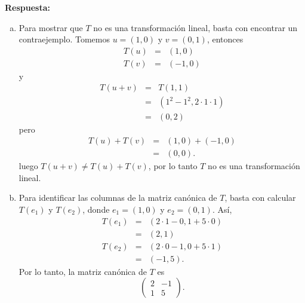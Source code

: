 \documentclass{article}
\begin{document}
\vspace{5mm}
\noindent\textbf{Respuesta:}
\begin{enumerate}[a)]
  \item Para mostrar que $T$ no es una transformación lineal, basta con encontrar un contraejemplo. Tomemos $u=(1,0)$ y $v=(0,1)$, entonces
    \begin{eqnarray*}
      T(u) &=& (1,0)\\
      T(v) &=& (-1,0)
    \end{eqnarray*}
    y
    \begin{eqnarray*}
      T(u+v) &=& T(1,1)\\
        &=& (1^2-1^2,2\cdot1\cdot1)\\
        &=& (0,2)
    \end{eqnarray*}
    pero
    \begin{eqnarray*}
      T(u)+T(v) &=& (1,0)+(-1,0)\\
        &=& (0,0).
    \end{eqnarray*}
    luego $T(u+v)\neq T(u)+T(v)$, por lo tanto $T$ no es una transformación lineal.\\
  \vspace{0.5cm}
  \item Para identificar las columnas de la matriz canónica de $T$, basta con calcular $T(e_1)$ y $T(e_2)$, donde $e_1=(1,0)$ y $e_2=(0,1)$. Así,
    \begin{eqnarray*}
      T(e_1) &=& (2\cdot1-0,1+5\cdot0)\\
        &=& (2,1)\\
      T(e_2) &=& (2\cdot0-1,0+5\cdot1)\\
        &=& (-1,5).
    \end{eqnarray*}
    Por lo tanto, la matriz canónica de $T$ es
    $$\begin{pmatrix}2 & -1\\1 & 5\end{pmatrix}.$$
\end{enumerate}
\end{document}
